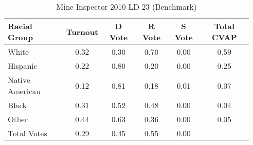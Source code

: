 \begin{table}[htb]
\begin{center}
\caption{Mine Inspector 2010 LD 23 (Benchmark)}
\label{smine_cvap_ld_23_benchmark}
\begin{tabular}{lccccc}
  \hline
Racial Group & Turnout & D Vote & R Vote & S Vote & Total CVAP \\ 
  \hline
White & 0.32 & 0.30 & 0.70 & 0.00 & 0.59 \\ 
  Hispanic & 0.22 & 0.80 & 0.20 & 0.00 & 0.25 \\ 
  Native American & 0.12 & 0.81 & 0.18 & 0.01 & 0.07 \\ 
  Black & 0.31 & 0.52 & 0.48 & 0.00 & 0.04 \\ 
  Other & 0.44 & 0.63 & 0.36 & 0.00 & 0.05 \\ 
  Total Votes & 0.29 & 0.45 & 0.55 & 0.00 &  \\ 
   \hline
\end{tabular}
\end{center}
\end{table}
